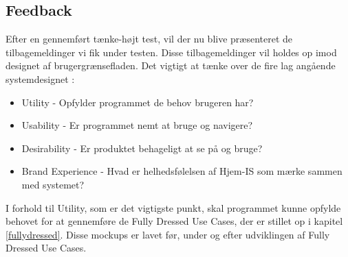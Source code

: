 \subsection{Feedback}
Efter en gennemført tænke-højt test, vil der nu blive præsenteret de tilbagemeldinger vi fik under testen. Disse tilbagemeldinger vil holdes op imod designet af brugergrænsefladen. Det vigtigt at tænke over de fire lag angående systemdesignet \cite{UIdesign}:
\begin{itemize}
    \item Utility - Opfylder programmet de behov brugeren har?
    \item Usability - Er programmet nemt at bruge og navigere?
    \item Desirability - Er produktet behageligt at se på og bruge?
    \item Brand Experience - Hvad er helhedsfølelsen af Hjem-IS som mærke sammen med systemet?
\end{itemize}
I forhold til Utility, som er det vigtigste punkt, skal programmet kunne opfylde behovet for at gennemføre de Fully Dressed Use Cases, der er stillet op i kapitel \ref{fullydressed}. Disse mockups er lavet før, under og efter udviklingen af Fully Dressed Use Cases.


